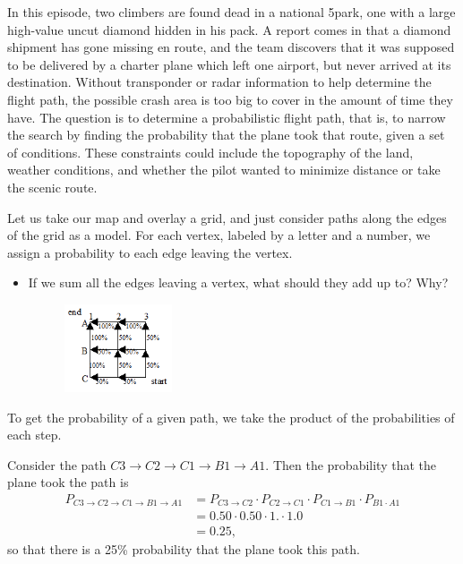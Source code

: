 \newpage
{}
{}
\setcounter{activity}{0}

In this episode, two climbers are found dead in a national 5park, one with a large high-value uncut diamond hidden in his pack. A report comes in that a diamond shipment has gone missing en route, and the team discovers that it was supposed to be delivered by a charter plane which left one airport, but never arrived at its destination. Without transponder or radar information to help determine the flight path, the possible crash area is too big to cover in the amount of time they have. The question is to determine a probabilistic flight path, that is, to narrow the search by finding the probability that the plane took that route, given a set of conditions. These constraints could include the topography of the land, weather conditions, and whether the pilot wanted to minimize distance or take the scenic route.


Let us take our map and overlay a grid, and just consider paths along the edges of the grid as a model. For each vertex, labeled by a letter and a number, we assign a probability to each edge leaving the vertex.


\begin{itemize}
\item If we sum all the edges leaving a vertex, what should they add up to? Why?

	\begin{figure}[H]
	\centering
	\includegraphics[width=0.30\textwidth]{../sections/seasons/season5/501/images/cover_me.png}
	\end{figure}

\end{itemize}


To get the probability of a given path, we take the product of the probabilities of each step.


\begin{ex}
Consider the path $C3 \to C2 \to C1 \to B1 \to A1$. Then the probability that the plane took the path is
	\[
	\begin{split}
	P_{C3 \to C2 \to C1 \to B1 \to A1}&= P_{C3 \to C2} \cdot P_{C2 \to C1} \cdot P_{C1 \to B1} \cdot P_{B1 \cdot A1} \\
	&= 0.50 \cdot 0.50 \cdot 1. \cdot 1.0 \\
	&= 0.25,
	\end{split}
	\]
so that there is a 25\% probability that the plane took this path. 
\end{ex}


